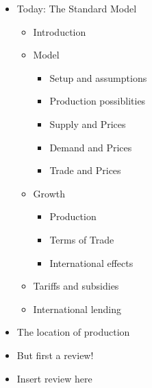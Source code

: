 \documentclass[ignorenonframetext,]{beamer}
\begin{document}
\begin{frame}
\begin{itemize}
\itemsep1pt\parskip0pt
\item
  Today: The Standard Model 
  \begin{itemize}
        \item Introduction
        \item Model
        \begin{itemize}
            \item Setup and assumptions
            \item Production possiblities 
            \item Supply and Prices
            \item Demand and Prices
            \item Trade and Prices
        \end{itemize}
        \item Growth
        \begin{itemize}
            \item Production
            \item Terms of Trade
            \item International effects
        \end{itemize}
        \item Tariffs and subsidies
        \item International lending
    \end{itemize}
    \item The location of production
\end{itemize}

\end{frame}

\begin{frame}
    \begin{itemize}
        \item But first a review!
    \end{itemize}
\end{frame}

\begin{frame}
    \begin{itemize}
        \item Insert review here
    \end{itemize}
\end{frame}
\end{document}

